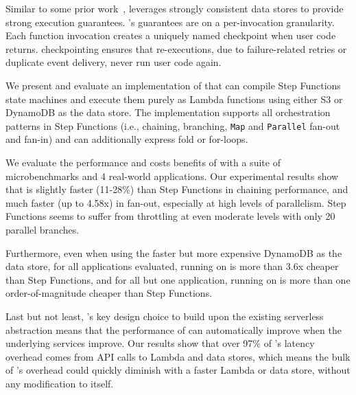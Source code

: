 
Similar to some prior work~\cite{boki, beldi}, \name{} leverages strongly
consistent data stores to provide strong execution guarantees. \name{}'s
guarantees are on a per-invocation granularity. Each function invocation
creates a uniquely named checkpoint when user code returns.
\name{} checkpointing ensures that re-executions, due to failure-related
retries or duplicate event delivery, never run user code again.


We present and evaluate an implementation of \name{} that can compile Step
Functions state machines and execute them purely as Lambda functions using
either S3 or DynamoDB as the data store. The implementation supports all
orchestration patterns in Step Functions (i.e., chaining, branching,
\texttt{Map} and \texttt{Parallel} fan-out and fan-in) and can additionally
express fold or for-loops.

We evaluate the performance and costs benefits of \name{} with a suite of
microbenchmarks and 4 real-world applications. Our experimental results show
that \name{} is slightly faster (11-28\%) than Step Functions in chaining
performance, and much faster (up to 4.58x) in fan-out, especially at high
levels of parallelism. Step Functions seems to suffer from throttling at even
moderate levels with only 20 parallel branches.

Furthermore, even when using the faster but more expensive DynamoDB as the
data store, for all applications evaluated, running on \name{} is more than
3.6x cheaper than Step Functions, and for all but one application, running on
\name{} is more than one order-of-magnitude cheaper than Step Functions.

Last but not least, \name{}'s key design choice to build upon the existing
serverless abstraction means that the performance of \name{} can automatically
improve when the underlying services improve. Our results show that over 97\%
of \name{}'s latency overhead comes from API calls to Lambda and data stores,
which means the bulk of \name{}'s overhead could quickly diminish with a
faster Lambda or data store, without any modification to \name{} itself.




